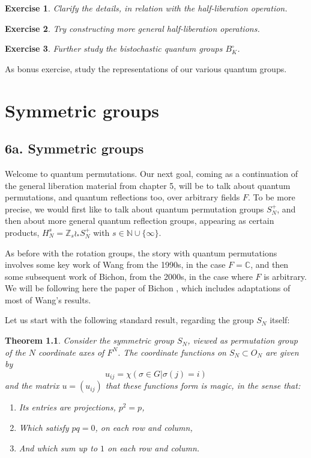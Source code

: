 \documentclass[12pt]{amsbook}
\newtheorem{theorem}{Theorem}[chapter]
\newtheorem{exercise}[theorem]{Exercise}
\begin{document}
\begin{exercise}
Clarify the details, in relation with the half-liberation operation.
\end{exercise}

\begin{exercise}
Try constructing more general half-liberation operations.
\end{exercise}

\begin{exercise}
Further study the bistochastic quantum groups $B_K^\circ$.
\end{exercise}

As bonus exercise, study the representations of our various quantum groups.

\chapter{Symmetric groups}

\section*{6a. Symmetric groups}

Welcome to quantum permutations. Our next goal, coming as a continuation of the general liberation material from chapter 5, will be to talk about quantum permutations, and quantum reflections too, over arbitrary fields $F$. To be more precise, we would first like to talk about quantum permutation groups $S_N^+$, and then about more general quantum reflection groups, appearing as certain products, $H_N^s=\mathbb Z_s\wr_*S_N^+$ with $s\in\mathbb N\cup\{\infty\}$.

\bigskip

As before with the rotation groups, the story with quantum permutations involves some key work of Wang from the 1990s, in the case $F=\mathbb C$, and then some subsequent work of Bichon, from the 2000s, in the case where $F$ is arbitrary. We will be following here the paper of Bichon \cite{bi4}, which includes adaptations of most of Wang's results.

\bigskip

Let us start with the following standard result, regarding the group $S_N$ itself:


\begin{theorem}
Consider the symmetric group $S_N$, viewed as permutation group of the $N$ coordinate axes of $F^N$. The coordinate functions on $S_N\subset O_N$ are given by
$$u_{ij}=\chi\left(\sigma\in G\Big|\sigma(j)=i\right)$$
and the matrix $u=(u_{ij})$ that these functions form is magic, in the sense that:
\begin{enumerate}
\item Its entries are projections, $p^2=p$,

\item Which satisfy $pq=0$, on each row and column,

\item And which sum up to $1$ on each row and column.
\end{enumerate}
\end{theorem}
\end{document}
